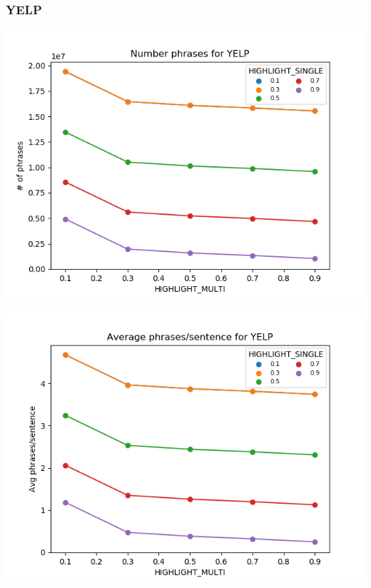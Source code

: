 \documentclass[11pt]{article}
\begin{document}
\subsubsection*{YELP}
\begin{multicols}{2}
\includegraphics[scale=0.27]{n_phrases_yelp.png}

\includegraphics[scale=0.27]{avg_phrases_yelp.png}
\end{multicols}
\end{document}

